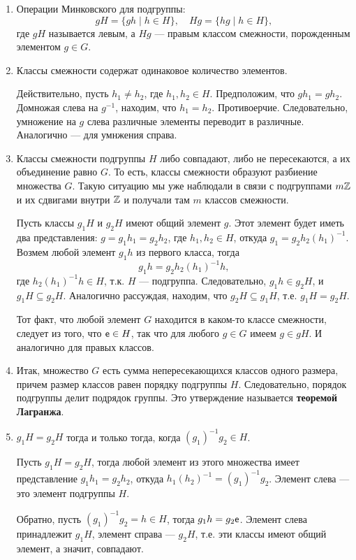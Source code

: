 \begin{enumerate}
\item Операции Минковского для подгруппы:
$$
gH=\{gh\mid h\in H\},\quad Hg=\{hg\mid h\in H\},
$$
где $gH$ называется левым, а $Hg$ --- правым классом смежности, порожденным элементом $g\in G$.

\item Классы смежности содержат одинаковое количество элементов.

Действительно, пусть $h_1\ne h_2$, где $h_1,h_2\in H$. Предположим, что $gh_1=gh_2$. Домножая слева на $g^{-1}$, находим, что $h_1=h_2$. Противоерчие. Следовательно, умножение на $g$ слева различные элементы переводит в различные. Аналогично --- для умнжения справа.

\item Классы смежности подгруппы $H$ либо совпадают, либо не пересекаются, а их объединение равно $G$. То есть, классы смежности образуют разбиение множества $G$. Такую ситуацию мы уже наблюдали в связи с подгруппами $m\mathbb Z$ и их сдвигами внутри $\mathbb Z$ и получали там $m$ классов смежности.

Пусть классы $g_1H$ и $g_2H$ имеют общий элемент $g$. Этот элемент будет иметь два представления: $g=g_1h_1=g_2h_2$, где $h_1,h_2\in H$, откуда $g_1=g_2h_2(h_1)^{-1}$. Возмем любой элемент $g_1h$ из первого класса, тогда
$$
g_1h = g_2h_2(h_1)^{-1}h,
$$
где $h_2(h_1)^{-1}h\in H$, т.к. $H$ --- подгруппа. Следовательно, $g_1h\in g_2H$, и $g_1H\subseteq g_2H$. Аналогично рассуждая, находим, что $g_2H\subseteq g_1H$, т.е. $g_1H=g_2H$.

Тот факт, что любой элемент $G$ находится в каком-то классе смежности, следует из того, что $\mathsf e\in H$, так что для любого $g\in G$ имеем $g\in gH$. И аналогично для правых классов.

\item Итак, множество $G$ есть сумма непересекающихся классов одного размера, причем размер классов равен порядку подгруппы $H$. Следовательно, порядок подгруппы делит подрядок группы. Это утверждение называется \textbf{теоремой Лагранжа}.

\item $g_1H=g_2H$ тогда и только тогда, когда $(g_1)^{-1}g_2\in H$.

Пусть $g_1H=g_2H$, тогда любой элемент из этого множества имеет представление $g_1h_1=g_2h_2$, откуда $h_1(h_2)^{-1}=(g_1)^{-1}g_2$. Элемент слева --- это элемент подгруппы $H$.

Обратно, пусть $(g_1)^{-1}g_2=h\in H$, тогда $g_1h=g_2\mathsf e$. Элемент слева принадлежит $g_1H$, элемент справа --- $g_2H$, т.е. эти классы имеют общий элемент, а значит, совпадают.


\end{enumerate}
